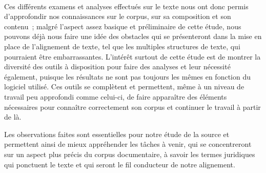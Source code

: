 \paragraph{}Ces différents examens et analyses effectués sur le texte nous ont donc permis d'approfondir nos connaissances sur le corpus, sur sa composition et son contenu~; malgré l'aspect assez basique et préliminaire de cette étude, nous pouvons déjà nous faire une idée des obstacles qui se présenteront dans la mise en place de l'alignement de texte, tel que les multiples structures de texte, qui pourraient être embarrassantes. L'intérêt surtout de cette étude est de montrer la diversité des outils à disposition pour faire des analyses et leur nécessité également, puisque les résultats ne sont pas toujours les mêmes en fonction du logiciel utilisé. Ces outils se complètent et permettent, même à un niveau de travail peu approfondi comme celui-ci, de faire apparaître des éléments nécessaires pour connaître correctement son corpus et continuer le travail à partir de là.

Les observations faites sont essentielles pour notre étude de la source et permettent ainsi de mieux appréhender les tâches à venir, qui se concentreront sur un aspect plus précis du corpus documentaire, à savoir les termes juridiques qui ponctuent le texte et qui seront le fil conducteur de notre alignement. 